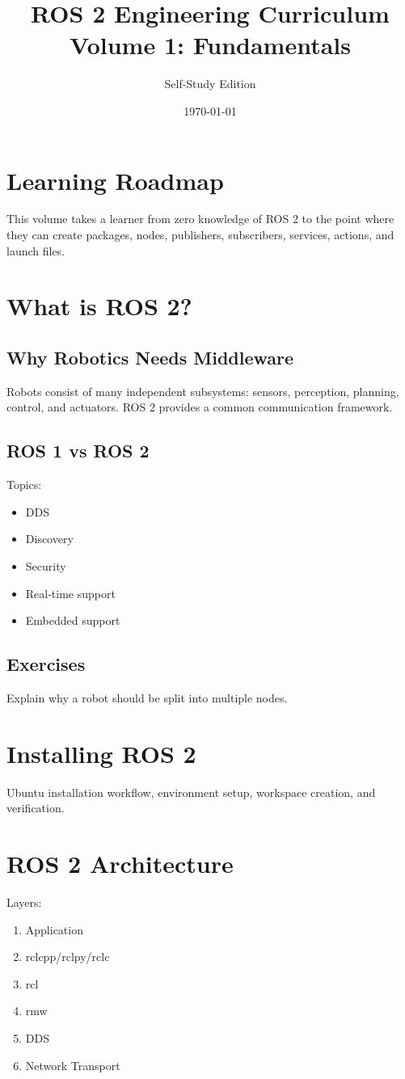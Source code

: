 \documentclass[11pt,oneside]{book}
\title{ROS 2 Engineering Curriculum \\ Volume 1: Fundamentals}
\author{Self-Study Edition}
\date{\today}
\begin{document}
\maketitle
\tableofcontents

\chapter{Learning Roadmap}
This volume takes a learner from zero knowledge of ROS 2 to the point where
they can create packages, nodes, publishers, subscribers, services, actions,
and launch files.

\chapter{What is ROS 2?}
\section{Why Robotics Needs Middleware}
Robots consist of many independent subsystems:
sensors, perception, planning, control, and actuators.
ROS 2 provides a common communication framework.

\section{ROS 1 vs ROS 2}
Topics:
\begin{itemize}
\item DDS
\item Discovery
\item Security
\item Real-time support
\item Embedded support
\end{itemize}

\section*{Exercises}
Explain why a robot should be split into multiple nodes.

\chapter{Installing ROS 2}
Ubuntu installation workflow, environment setup,
workspace creation, and verification.

\chapter{ROS 2 Architecture}
Layers:
\begin{enumerate}
\item Application
\item rclcpp/rclpy/rclc
\item rcl
\item rmw
\item DDS
\item Network Transport
\end{enumerate}
\end{document}
